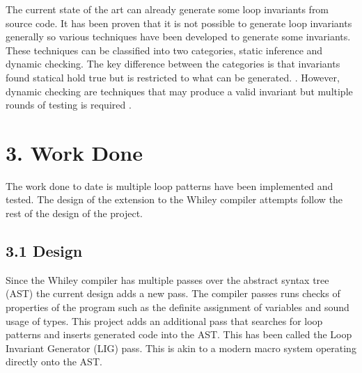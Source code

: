 \documentclass[11pt, a4paper, twoside, openright]{report}
\begin{document}
The current state of the art can already generate some loop invariants
from source code.
It has been proven that it is not possible to generate loop invariants
generally %
so various techniques have been developed to generate some invariants.
These techniques can be classified into two categories,
static inference and dynamic checking.
The key difference between the categories is
that invariants found statical hold true
but is restricted to what can be generated.
\cite{benderfinding}\cite{Leino2005LoopIO}.
However, dynamic
checking are techniques that may produce a valid invariant
but multiple rounds of testing is required
\cite{infer-dynamic}
\cite{infer-postconditions}.




\section*{3. Work Done}

The work done to date is multiple loop patterns have been implemented and
tested. The design of the extension to the Whiley compiler attempts follow
the rest of the design of the project.

\subsection*{3.1 Design}

Since the Whiley compiler has multiple passes over the abstract syntax tree
(AST)
the current design adds a new pass. The compiler passes runs checks of properties
of the program such as the definite assignment of variables and sound usage of
types. This project adds an additional pass that searches for loop patterns and
inserts generated code into the AST.
This has been called the Loop Invariant Generator (LIG) pass.
This is akin to a modern macro system operating directly onto the AST.
\end{document}
